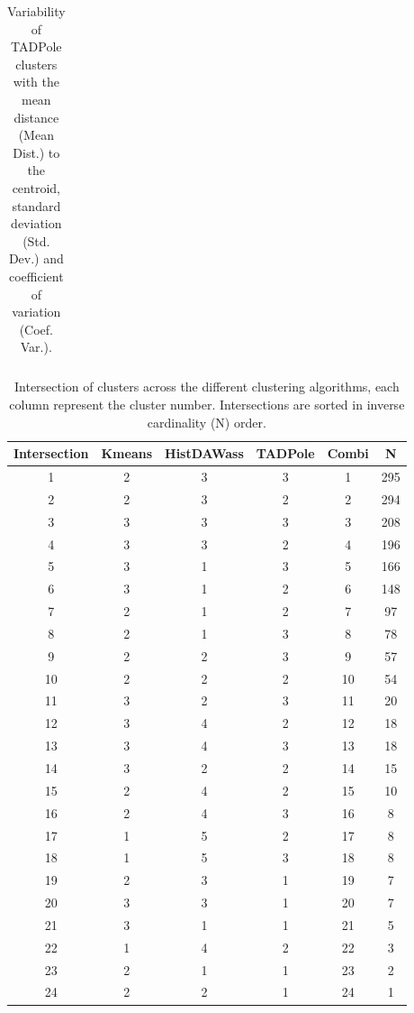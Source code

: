 \documentclass{bmcart}
\begin{document}
\begin{backmatter}
\begin{table}[h!]
\begin{tabular}{ccccc}
		\hline
	\end{tabular}
	\caption{Variability of TADPole clusters with the mean distance (Mean Dist.) to the centroid, standard deviation (Std. Dev.) and coefficient of variation (Coef. Var.).}
	\label{tab:TADPoleQual}
\end{table}

\begin{table}[ht]
	\centering
	\begin{tabular}{cccccc}
		\hline
		 Intersection & Kmeans & HistDAWass & TADPole & Combi & N \\ 
		\hline
		1 &   2 &   3 &   3 &   1 & 295 \\ 
		2 &   2 &   3 &   2 &   2 & 294 \\ 
		3 &   3 &   3 &   3 &  3 & 208 \\ 
		4 &   3 &   3 &   2 &  4 & 196 \\ 
		5 &   3 &   1 &   3 &  5 & 166 \\ 
		6 &   3 &   1 &   2 &  6 & 148 \\ 
		7 &   2 &   1 &   2 &   7 &  97 \\ 
		8 &   2 &   1 &   3 &   8 &  78 \\ 
		9 &   2 &   2 &   3 &   9 &  57 \\ 
		10 &   2 &   2 &   2 &   10 &  54 \\ 
		11 &   3 &   2 &   3 &  11 &  20 \\ 
		12 &   3 &   4 &   2 &  12 &  18 \\ 
		13 &   3 &   4 &   3 &  13 &  18 \\ 
		14 &   3 &   2 &   2 &  14 &  15 \\ 
		15 &   2 &   4 &   2 &  15 &  10 \\ 
		16 &   2 &   4 &   3 &  16 &   8 \\ 
		17 &   1 &   5 &   2 &  17 &   8 \\ 
		18 &   1 &   5 &   3 &  18 &   8 \\ 
		19 &   2 &   3 &   1 &  19 &   7 \\ 
		20 &   3 &   3 &   1 &  20 &   7 \\ 
		21 &   3 &   1 &   1 &  21 &   5 \\ 
		22 &   1 &   4 &   2 &  22 &   3 \\ 
		23 &   2 &   1 &   1 &  23 &   2 \\ 
		24 &   2 &   2 &   1 &  24 &   1 \\ 
		\hline
	\end{tabular}
	\caption{Intersection of clusters across the different clustering algorithms, each column represent the cluster number. Intersections are sorted in inverse cardinality (N) order.}
	\label{tab:HigherCard}
\end{table}


\end{backmatter}
\end{document}
